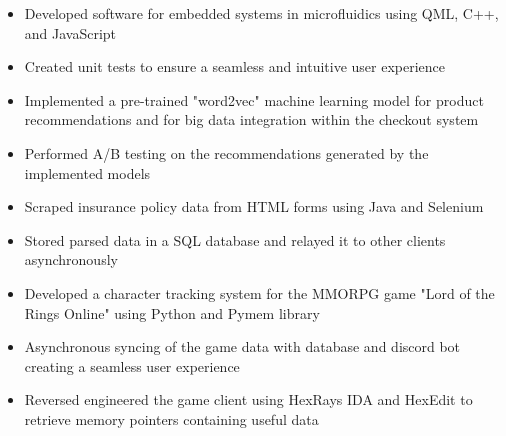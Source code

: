 \documentclass[10pt,a4paper,ragged2e]{altacv}
\begin{document}

\begin{fullwidth}\makecvheader
\end{fullwidth}


\begin{itemize}
\item Developed software for embedded systems in microfluidics using QML, C++, and JavaScript
\item Created unit tests to ensure a seamless and intuitive user experience
\end{itemize}

\divider

\begin{itemize}
\item Implemented a pre-trained "word2vec" machine learning model for product recommendations and for big data integration within the checkout system
\item Performed A/B testing on the recommendations generated by the implemented models
\end{itemize}

\divider

\begin{itemize}
\item Scraped insurance policy data from HTML forms using Java and Selenium
\item Stored parsed data in a SQL database and relayed it to other clients asynchronously
\end{itemize}


\begin{itemize}
\item Developed a character tracking system for the MMORPG game "Lord of the Rings Online" using Python and Pymem library
\item Asynchronous syncing of the game data with database and discord bot creating a seamless user experience
\item Reversed engineered the game client using HexRays IDA and HexEdit to retrieve memory pointers containing useful data
\end{itemize}
\end{document}
